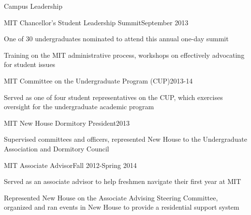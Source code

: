 \documentclass{resume} %
\begin{document}
\begin{rSection}{Campus Leadership}

\begin{rSubsection}{MIT Chancellor's Student Leadership Summit}{September 2013}{}{}
\item One of 30 undergraduates nominated to attend this annual one-day summit
\item Training on the MIT administrative process, workshops on effectively advocating for student issues 
\end{rSubsection}

\begin{rSubsection}{MIT Committee on the Undergraduate Program (CUP)}{2013-14}{}{}
\item Served as one of four student representatives on the CUP, which exercises oversight for the undergraduate academic program
\end{rSubsection}

\begin{rSubsection}{MIT New House Dormitory President}{2013}{}{}
\item Supervised committees and officers, represented New House to the Undergraduate Association and Dormitory Council
\end{rSubsection}

\begin{rSubsection}{MIT Associate Advisor}{Fall 2012-Spring 2014}{}{}
\item Served as an associate advisor to help freshmen navigate their first year at MIT
\item Represented New House on the Associate Advising Steering Committee, organized and ran events in New House to provide a residential support system
\end{rSubsection}

\end{rSection}
\end{document}
